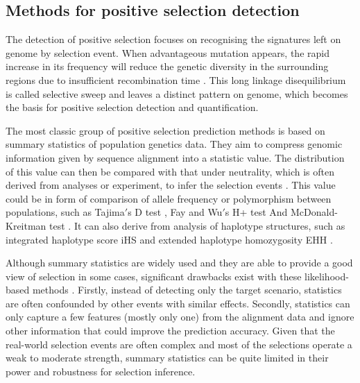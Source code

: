 \documentclass[a4paper,12pt,oneside]{extarticle}
\begin{document}
\subsection{Methods for positive selection detection}
The detection of positive selection focuses on recognising the signatures left on genome by selection event. When advantageous mutation appears, the rapid increase in its frequency will reduce the genetic diversity in the surrounding regions due to insufficient recombination time \cite{12}. This long linkage disequilibrium is called selective sweep and leaves a distinct pattern on genome, which becomes the basis for positive selection detection and quantification.
\par
The most classic group of positive selection prediction methods is based on summary statistics of population genetics data. They aim to compress genomic information given by sequence alignment into a statistic value. The distribution of this value can then be compared with that under neutrality, which is often derived from analyses or experiment, to infer the selection events \cite{13}. This value could be in form of comparison of allele frequency or polymorphism between populations, such as Tajima$'$s D test \cite{14}, Fay and Wu$'$s H+ test And McDonald-Kreitman test \cite{15}. It can also derive from analysis of haplotype structures, such as integrated haplotype score iHS \cite{16} and extended haplotype homozygosity EHH \cite{41}.
\par
Although summary statistics are widely used and they are able to provide a good view of selection in some cases, significant drawbacks exist with these likelihood-based methods \cite{17}. Firstly, instead of detecting only the target scenario, statistics are often confounded by other events with similar effects. Secondly, statistics can only capture a few features (mostly only one) from the alignment data and ignore other information that could improve the prediction accuracy. Given that the real-world selection events are often complex and most of the selections operate a weak to moderate strength, summary statistics can be quite limited in their power and robustness for selection inference.
\par
\end{document}
